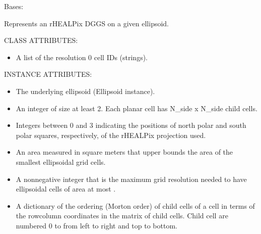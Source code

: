 \documentclass[a4paper,12ptopenany,oneside,english]{sphinxmanual}
\begin{document}
\begin{fulllineitems}
\label{\detokenize{dggs:rhealpixdggs.dggs.RHEALPixDGGS}}
\pysigstartsignatures
{}
\pysigstopsignatures
\sphinxAtStartPar
Bases: 

\sphinxAtStartPar
Represents an rHEALPix DGGS on a given ellipsoid.

\sphinxAtStartPar
CLASS ATTRIBUTES:
\begin{itemize}
\item {} 
\sphinxAtStartPar
{} \sphinxhyphen{} A list of the resolution 0 cell IDs (strings).

\end{itemize}

\sphinxAtStartPar
INSTANCE ATTRIBUTES:
\begin{itemize}
\item {} 
\sphinxAtStartPar
{} \sphinxhyphen{} The underlying ellipsoid (Ellipsoid instance).

\item {} 
\sphinxAtStartPar
{} \sphinxhyphen{} An integer of size at least 2.
Each planar cell has N\_side x N\_side child cells.

\item {} 
\sphinxAtStartPar
{} \sphinxhyphen{} Integers between 0 and 3 indicating
the positions of north polar and south polar squares, respectively,
of the rHEALPix projection used.

\item {} 
\sphinxAtStartPar
{} \sphinxhyphen{} An area measured in square meters that
upper bounds the area of the smallest ellipsoidal grid cells.

\item {} 
\sphinxAtStartPar
{} \sphinxhyphen{} A nonnegative integer that is the maximum grid
resolution needed to have ellipsoidal cells of area at most
.

\item {} 
\sphinxAtStartPar
{} \sphinxhyphen{} A dictionary of the ordering (Morton order) of child
cells of a cell in terms of the row\sphinxhyphen{}column coordinates in the matrix
of child cells.  Child cell are numbered 0 to  from
left to right and top to bottom.


\end{itemize}
\end{fulllineitems}
\end{document}
